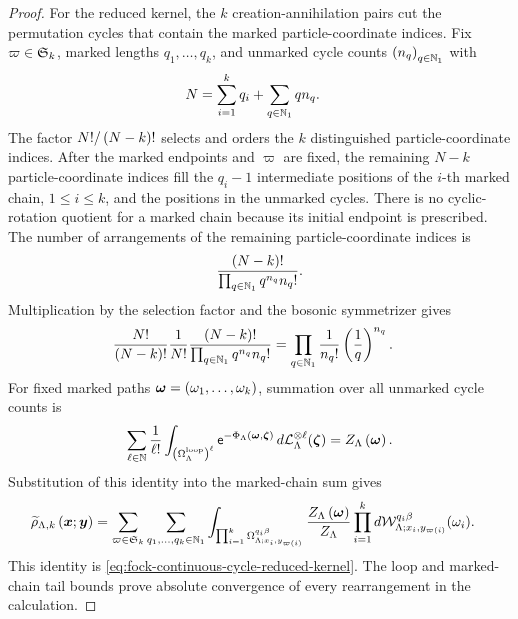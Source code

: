 \documentclass[11pt,a4paper]{article}
\theoremstyle{plain}
\theoremstyle{definition}
\theoremstyle{remark}
\begin{document}
\begin{proof}
For the reduced kernel, the $k$ creation-annihilation pairs cut the permutation cycles that contain the marked
particle-coordinate indices.
Fix $\varpi \in \grsym{k}$, marked lengths $q_1,\ldots,q_k$, and unmarked cycle counts
$\seq{n_q}{q \in \semigrposint}$ with
$$\begin{aligned}
N
& =
\sum_{i = 1}^{k}q_i
+
\sum_{q \in \mathbb{N}_1}q n_q.
\end{aligned}$$
The factor $N!/\left( N-k \right)!$ selects and orders the $k$ distinguished particle-coordinate indices.
After the marked endpoints and $\varpi$ are fixed, the remaining $N-k$ particle-coordinate indices fill the
$q_i-1$ intermediate positions of the $i$-th marked chain, $1\leq i\leq k$, and the positions in the unmarked
cycles.
There is no cyclic-rotation quotient for a marked chain because its initial endpoint is prescribed.
The number of arrangements of the remaining particle-coordinate indices is
$$\begin{aligned}
\frac{\left( N-k \right)!}
{\prod_{q\in\mathbb{N}_1}q^{n_q}n_q!}.
\end{aligned}$$
Multiplication by the selection factor and the bosonic symmetrizer gives
$$\begin{aligned}
\frac{N!}{\left( N - k \right)!}
\frac{1}{N!}
\frac{\left( N - k \right)!}{\prod_{q \in \mathbb{N}_1}q^{n_q} n_q!}
& =
\prod_{q \in \mathbb{N}_1}
\frac{1}{n_q!}\left( \frac{1}{q} \right)^{n_q}.
\end{aligned}$$
For fixed marked paths
$\boldsymbol{\omega}=\left( \omega_1,\ldots,\omega_k \right)$, summation over all unmarked cycle counts is
$$\begin{aligned}
\sum_{\ell\in\mathbb{N}}\frac{1}{\ell!}
\int_{\left( \Omega_{\Lambda}^{\mathrm{loop}} \right)^{\ell}}
\mathsf{e}^{-\Phi_{\Lambda} \left( \boldsymbol{\omega},\boldsymbol{\zeta} \right)}
\mathop{d \mathcal{L}_{\Lambda}^{\otimes\ell}}(\boldsymbol{\zeta})
=
Z_{\Lambda} \left( \boldsymbol{\omega} \right).
\end{aligned}$$
Substitution of this identity into the marked-chain sum gives
$$\begin{aligned}
\fun{\widetilde{\rho}_{\Lambda,k}}{\boldsymbol{x};\boldsymbol{y}}
& =
\sum_{\varpi \in \grsym{k}}
\sum_{q_1,\ldots,q_k\in\semigrposint}
\int_{\prod_{i=1}^{k}
\Omega_{\Lambda;x_i,y_{\fun{\varpi}{i}}}^{q_i\beta}}
\frac{\fun{Z_{\Lambda}}{\boldsymbol{\omega}}}{Z_{\Lambda}}
\prod_{i=1}^{k}
\opdmsr{\msrcal{W}_{\Lambda;x_i,y_{\fun{\varpi}{i}}}^{q_i\beta}}(\omega_i).
\end{aligned}$$
This identity is \eqref{eq:fock-continuous-cycle-reduced-kernel}.
The loop and marked-chain tail bounds prove absolute convergence of every rearrangement in the calculation.
\end{proof}
\end{document}
